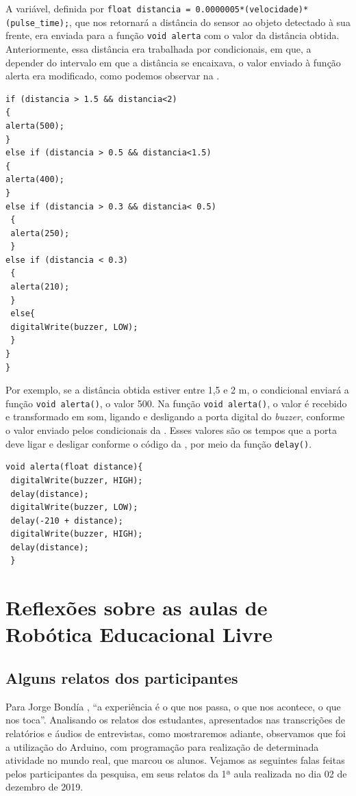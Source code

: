 \documentclass{textolivre}
\begin{document}
A variável, definida por \lstinline{float distancia = 0.0000005*(velocidade)*(pulse_time);}, que nos retornará a distância do sensor ao objeto detectado à sua frente, era enviada para a função \lstinline{void alerta} com o valor da distância obtida. Anteriormente, essa distância era trabalhada por condicionais, em que, a depender do intervalo em que a distância se encaixava, o valor enviado à função alerta era modificado, como podemos observar na .
 
\begin{lstlisting}[label=lst08, caption={Convertendo a distância em intervalos para a função alerta.}, source={Elaborado pelos autores e participantes.}]
if (distancia > 1.5 && distancia<2)
{
alerta(500);
}
else if (distancia > 0.5 && distancia<1.5)
{
alerta(400);
}
else if (distancia > 0.3 && distancia< 0.5)
 {
 alerta(250);
 }
else if (distancia < 0.3)
 {
 alerta(210);
 }
 else{
 digitalWrite(buzzer, LOW);
 }
}
}
\end{lstlisting} %

Por exemplo, se a distância obtida estiver entre 1,5 e 2 m, o condicional enviará a função \lstinline{void alerta()}, o valor 500. Na função \lstinline{void alerta()}, o valor é recebido e transformado em som, ligando e desligando a porta digital do \emph{buzzer}, conforme o valor enviado pelos condicionais da . Esses valores são os tempos que a porta deve ligar e desligar conforme o código da , por meio da função \lstinline{delay()}.

\begin{lstlisting}[label=lst09, caption={Convertendo os valores dos condicionais em som.}, source={Elaborado pelos autores e participantes.}]
void alerta(float distance){
 digitalWrite(buzzer, HIGH);
 delay(distance); 
 digitalWrite(buzzer, LOW);
 delay(-210 + distance); 
 digitalWrite(buzzer, HIGH);
 delay(distance);
 }
\end{lstlisting} %

\section{Reflexões sobre as aulas de Robótica Educacional Livre}\label{sec-4}
\subsection{Alguns relatos dos participantes}
Para Jorge Bondía \textcite[p. 21]{larrosa2002}, “a experiência é o que nos passa, o que nos acontece, o que nos toca”. Analisando os relatos dos estudantes, apresentados nas transcrições de relatórios e áudios de entrevistas, como mostraremos adiante, observamos que foi a utilização do Arduino, com programação para realização de determinada atividade no mundo real, que marcou os alunos. Vejamos as seguintes falas feitas pelos participantes da pesquisa, em seus relatos da 1ª aula realizada no dia 02 de dezembro de 2019.
\end{document}

